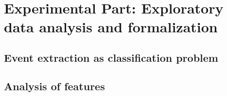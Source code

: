 \chapter{Experimental Part: Exploratory data analysis and formalization}
\section{Event extraction as classification problem}
\section{Analysis of features}